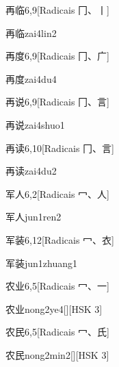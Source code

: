 \begin{entry}{再临}{6,9}[Radicais ⼌、⼁]
  \begin{phonetics}{再临}{zai4lin2}
  \end{phonetics}
\end{entry}

\begin{entry}{再度}{6,9}[Radicais ⼌、⼴]
  \begin{phonetics}{再度}{zai4du4}
  \end{phonetics}
\end{entry}

\begin{entry}{再说}{6,9}[Radicais ⼌、⾔]
  \begin{phonetics}{再说}{zai4shuo1}
  \end{phonetics}
\end{entry}

\begin{entry}{再读}{6,10}[Radicais ⼌、⾔]
  \begin{phonetics}{再读}{zai4du2}
  \end{phonetics}
\end{entry}

\begin{entry}{军人}{6,2}[Radicais ⼍、⼈]
  \begin{phonetics}{军人}{jun1ren2}
  \end{phonetics}
\end{entry}

\begin{entry}{军装}{6,12}[Radicais ⼍、⾐]
  \begin{phonetics}{军装}{jun1zhuang1}
  \end{phonetics}
\end{entry}

\begin{entry}{农业}{6,5}[Radicais ⼍、⼀]
  \begin{phonetics}{农业}{nong2ye4}[][HSK 3]
  \end{phonetics}
\end{entry}

\begin{entry}{农民}{6,5}[Radicais ⼍、⽒]
  \begin{phonetics}{农民}{nong2min2}[][HSK 3]
  \end{phonetics}
\end{entry}

